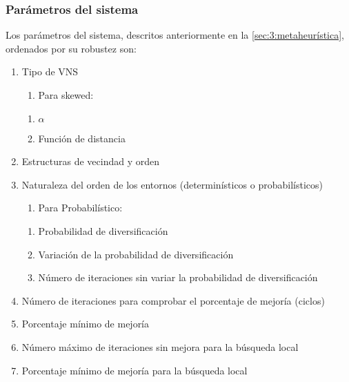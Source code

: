 
\subsubsection{Parámetros del sistema} \label{sec:5:parametros-sistema}
Los parámetros del sistema, descritos anteriormente en la \autoref{sec:3:metaheurística}, ordenados por su robustez son:
\begin{enumerate}
	\item Tipo de VNS
	\begin{enumerate}[label={},left=-1pt]
		\item Para skewed:
	\end{enumerate}
	\begin{enumerate}[label*={\arabic*}]
		\item $\alpha$
		\item Función de distancia 
	\end{enumerate}
	\item Estructuras de vecindad y orden
	\item Naturaleza del orden de los entornos (determinísticos o probabilísticos)
	\begin{enumerate}[label={},left=-1pt]
		\item Para Probabilístico:
	\end{enumerate}
	\begin{enumerate}[label*={\arabic*}]
		\item Probabilidad de diversificación
		\item Variación de la probabilidad de diversificación 
		\item Número de iteraciones sin variar la probabilidad de diversificación 
	\end{enumerate}
	\item Número de iteraciones para comprobar el porcentaje de mejoría (ciclos)
	\item Porcentaje mínimo de mejoría
	\item Número máximo de iteraciones sin mejora para la búsqueda local
	\item Porcentaje mínimo de mejoría para la búsqueda local
\end{enumerate}

